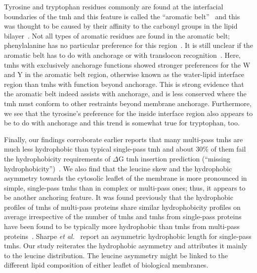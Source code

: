 Tyrosine and tryptophan residues commonly are found at the interfacial boundaries of the \gls{tmh} and this feature is called the ``aromatic belt''~\cite{Sharpe2010, Baeza-Delgado2013, Granseth2005, Nilsson2005a, Hessa2005} and this was thought to be caused by their affinity to the carbonyl groups in the lipid bilayer~\cite{Killian2000}. Not all types of aromatic residues are found in the aromatic belt; phenylalanine has no particular preference for this region~\cite{Granseth2005, Braun1999}. It is still unclear if the aromatic belt has to do with anchorage or with translocon recognition~\cite{Baeza-Delgado2013}. Here, \gls{tmh}s with exclusively anchorage functions showed stronger preferences for the W and Y in the aromatic belt region, otherwise known as the water-lipid interface region than \gls{tmh}s with function beyond anchorage. This is strong evidence that the aromatic belt indeed assists with anchorage, and is less conserved where the \gls{tmh} must conform to other restraints beyond membrane anchorage. Furthermore, we see that the tyrosine's preference for the inside interface region also appears to be to do with anchorage and this trend is somewhat true for tryptophan, too.

Finally, our findings corroborate earlier reports that many multi-pass \gls{tmh}s are much less hydrophobic than typical single-pass \gls{tmh} and about 30\% of them fail the hydrophobicity requirements of $\Delta$G \gls{tmh} insertion prediction (``missing hydrophobicity'')~\cite{Hessa2005, Hedin2010, Hessa2007, Ojemalm2012}. We also find that the leucine skew and the hydrophobic asymmetry towards the cytosolic leaflet of the membrane is more pronounced in simple, single-pass \gls{tmh}s than in complex or multi-pass ones; thus, it appears to be another anchoring feature. It was found previously that the hydrophobic profiles of \gls{tmh}s of multi-pass proteins share similar hydrophobicity profiles on average irrespective of the number of \gls{tmh}s and \gls{tmh}s from single-pass proteins have been found to be typically more hydrophobic than \gls{tmh}s from multi-pass proteins~\cite{Wong2011}. Sharpe \textit{et al.}~\cite{Sharpe2010} report an asymmetric hydrophobic length for single-pass \gls{tmh}s. Our study reiterates the hydrophobic asymmetry and attributes it mainly to the leucine distribution. The leucine asymmetry might be linked to the different lipid composition of either leaflet of biological membranes.

